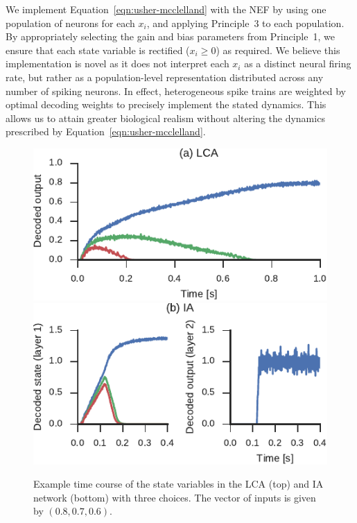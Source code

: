 \documentclass[10pt,letterpaper]{article}
\begin{document}
We implement Equation~\ref{eqn:usher-mcclelland} with the NEF by using one population of neurons for each $x_i$, and applying Principle~3 to each population.
By appropriately selecting the gain and bias parameters from Principle~1, we ensure that each state variable is rectified ($x_i \ge 0$) as required.
We believe this implementation is novel as it does not interpret each $x_i$ as a distinct neural firing rate, but rather as a population-level representation distributed across any number of spiking neurons.
In effect, heterogeneous spike trains are weighted by optimal decoding weights to precisely implement the stated dynamics.
This allows us to attain greater biological realism without altering the dynamics prescribed by Equation~\ref{eqn:usher-mcclelland}.
\begin{figure}[t]
    \centering
    \includegraphics{figures/usher-mcclelland}\\
    \vspace*{.3cm}
    \includegraphics{figures/indacc}
    \caption{
        Example time course of the state variables in the LCA (top) and IA network (bottom) with three choices.
        The vector of inputs is given by $(0.8, 0.7, 0.6)$.
    }\label{fig:usher-mcclelland}\label{fig:indacc}
\end{figure}
\end{document}
